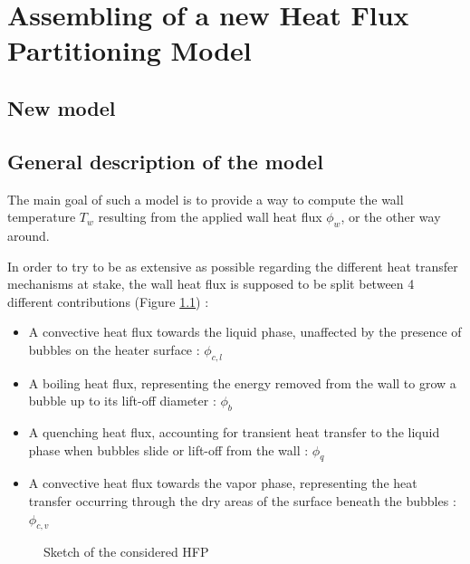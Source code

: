 
\chapter{Assembling of a new Heat Flux Partitioning Model} %

\label{ch:NewHFP} %


\section{New model}


\section{General description of the model}
\label{sec:model}

The main goal of such a model is to provide a way to compute the wall temperature $T_{w}$ resulting from the applied wall heat flux $\phi_{w}$, or the other way around.

\npar
In order to try to be as extensive as possible regarding the different heat transfer mechanisms at stake, the wall heat flux is supposed to be split between 4 different contributions (Figure \ref{fig:HFP}) :

\begin{itemize}
\item A convective heat flux towards the liquid phase, unaffected by the presence of bubbles on the heater surface : $\phi_{c,l}$
\item A boiling heat flux, representing the energy removed from the wall to grow a bubble up to its lift-off diameter : $\phi_{b}$
\item A quenching heat flux, accounting for transient heat transfer to the liquid phase when bubbles slide or lift-off from the wall : $\phi_{q}$
\item A convective heat flux towards the vapor phase, representing the heat transfer occurring through the dry areas of the surface beneath the bubbles : $\phi_{c,v}$
\end{itemize}


\begin{figure}[h!]
\centering

\caption{Sketch of the considered HFP}
\label{fig:HFP}
\end{figure}


